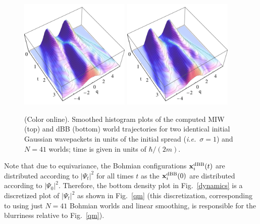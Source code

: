 \documentclass[12pt, aps,pra,amsmath,amssymb,superscriptaddress]{revtex4-2}
\newcommand{\ie}{{\em i.e.}}
\renewcommand{\(}{\left(}
\renewcommand{\)}{\right)}
\newcommand{\blk}{\color{black}}
\begin{document}
\begin{figure}[!t]
	\includegraphics[width=0.47\textwidth]{MIW_histogram.jpg}
	\includegraphics[width=0.47\textwidth]{dBB_histogram.jpg}
    \caption{\label{dynamics3d} (Color online).
     Smoothed histogram
        plots of the computed MIW (top) and dBB (bottom) world trajectories for
        two identical initial Gaussian wavepackets in units of the initial spread (\ie~$\sigma=1$) \blk  and $N=41$
    worlds; time is given in units of $\hbar/(2m)$.\blk}
\end{figure}
Note that due to equivariance, the Bohmian
configurations ${\bf x}^{\mathrm{dBB}}_{i}(t)$ are distributed according to
$|\Psi_t|^2$ for all times $t$ as the ${\bf x}^{\mathrm{dBB}}_i(0)$ are distributed according to
$|\Psi_0|^2$. Therefore, the bottom  density plot  in Fig.~\ref{dynamics} is a discretized plot of
$|\Psi_t|^2$ as shown in Fig.~\ref{qm}  (this discretization, corresponding
to using just $N=41$ Bohmian worlds and linear smoothing, is responsible for the
blurriness relative to Fig.~\ref{qm}). 
\end{document}
